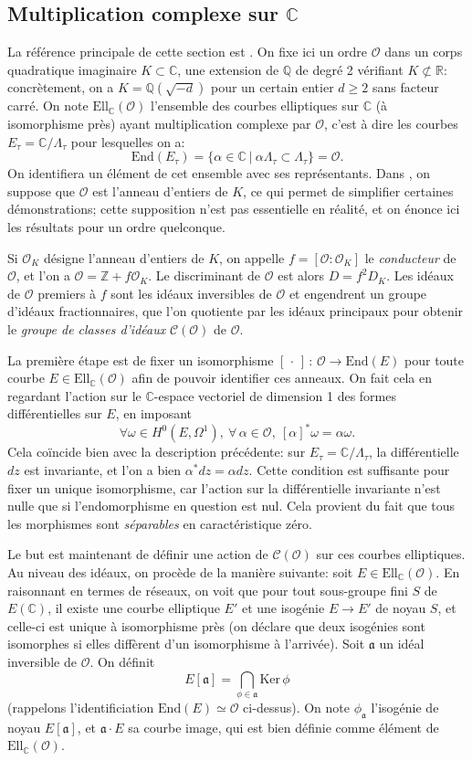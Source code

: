 \documentclass[11pt,a4paper]{article}
\newcommand{\Z}{\mathbb{Z}}
\newcommand{\C}{\mathbb{C}}
\newcommand{\Q}{\mathbb{Q}}
\newcommand{\R}{\mathbb{R}}
\renewcommand{\O}{\mathcal{O}}
\newcommand{\Cl}{\mathcal{C}}
\newcommand{\vers}{\longrightarrow}
\newcommand{\End}{\mathrm{End}}
\newcommand{\Ell}{\mathrm{Ell}}
\renewcommand{\frak}{\mathfrak}
\newcommand{\de}{\,:\,}
\renewcommand{\v}{\vspace{5mm}}
\theoremstyle{definition}
\begin{document}
\subsection{Multiplication complexe sur $\C$}


La référence principale de cette section est \cite{Sil2}. On fixe ici un ordre $\O$ dans un corps quadratique imaginaire $K\subset \C$, une extension de $\Q$ de degré 2 vérifiant $K \not\subset\R$: concrètement, on a $K=\Q(\sqrt{-d})$ pour un certain entier $d\geq 2$ sans facteur carré. On note $\Ell_\C(\O)$ l'ensemble des courbes elliptiques sur $\C$ (à isomorphisme près) ayant multiplication complexe par $\O$, c'est à dire les courbes $E_\tau = \C/\Lambda_\tau$ pour lesquelles on a:
$$\End(E_\tau) = \{\alpha\in \C\ |\ \alpha\Lambda_\tau \subset \Lambda_\tau\} = \O.$$
On identifiera un élément de cet ensemble avec ses représentants. Dans \cite{Sil2}, on suppose que $\O$ est l'anneau d'entiers de $K$, ce qui permet de simplifier certaines démonstrations; cette supposition n'est pas essentielle en réalité, et on énonce ici les résultats pour un ordre quelconque.

Si $\O_K$ désigne l'anneau d'entiers de $K$, on appelle $f=[\O:\O_K]$ le \emph{conducteur} de $\O$, et l'on a $\O = \Z  + f \O_K$. Le discriminant de $\O$ est alors $D = f^2 D_K$. Les idéaux de $\O$ premiers à $f$ sont les idéaux inversibles de $\O$ et engendrent un groupe d'idéaux fractionnaires, que l'on quotiente par les idéaux principaux pour obtenir le \emph{groupe de classes d'idéaux} $\Cl(\O)$ de $\O$.
\v

La première étape est de fixer un isomorphisme $[\,\cdot\,]\de \O\vers \End(E)$ pour toute courbe $E\in \Ell_\C(\O)$ afin de pouvoir identifier ces anneaux. On fait cela en regardant l'action sur le $\C$-espace vectoriel de dimension 1 des formes différentielles sur $E$, en imposant
$$\forall \omega\in H^0(E,\Omega^1),\ \forall\,\alpha\in\O,\ [\alpha]^*\omega = \alpha \omega.$$
Cela coïncide bien avec la description précédente: sur $E_\tau = \C/\Lambda_\tau$, la différentielle $dz$ est invariante, et l'on a bien $\alpha^* dz = \alpha dz$. Cette condition est suffisante pour fixer un unique isomorphisme, car l'action sur la différentielle invariante n'est nulle que si l'endomorphisme en question est nul. Cela provient du fait que tous les morphismes sont \emph{séparables} en caractéristique zéro.

Le but est maintenant de définir une action de $\Cl(\O)$ sur ces courbes elliptiques. Au niveau des idéaux, on procède de la manière suivante: soit $E\in \Ell_\C(\O)$. En raisonnant en termes de réseaux, on voit que pour tout sous-groupe fini $S$ de $E(\C)$, il existe une courbe elliptique $E'$ et une isogénie $E\vers E'$ de noyau $S$, et celle-ci est unique à isomorphisme près (on déclare que deux isogénies sont isomorphes si elles diffèrent d'un isomorphisme à l'arrivée). Soit $\frak a$ un idéal inversible de $\O$. On définit
$$E[\frak a]=\bigcap_{\phi\in \frak a} \mathrm{Ker}\,\phi$$
(rappelons l'identificiation $\End(E)\simeq\O$ ci-dessus). On note $\phi_{\frak a}$ l'isogénie de noyau $E[\frak a]$, et $\frak a\cdot E$ sa courbe image, qui est bien définie comme élément de $\Ell_\C(\O)$.
\end{document}
